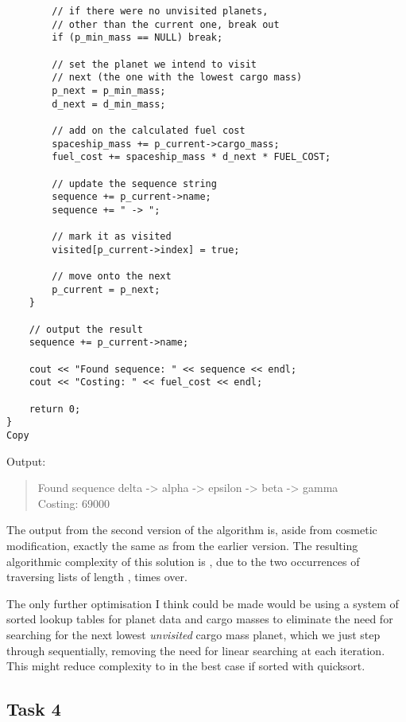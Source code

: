 \documentclass[
]{article}
\begin{document}
\begin{verbatim}
        // if there were no unvisited planets,
        // other than the current one, break out
        if (p_min_mass == NULL) break;

        // set the planet we intend to visit
        // next (the one with the lowest cargo mass)
        p_next = p_min_mass;
        d_next = d_min_mass;

        // add on the calculated fuel cost
        spaceship_mass += p_current->cargo_mass;
        fuel_cost += spaceship_mass * d_next * FUEL_COST;

        // update the sequence string
        sequence += p_current->name;
        sequence += " -> ";

        // mark it as visited
        visited[p_current->index] = true;

        // move onto the next
        p_current = p_next;
    }

    // output the result
    sequence += p_current->name;

    cout << "Found sequence: " << sequence << endl;
    cout << "Costing: " << fuel_cost << endl;

    return 0;
}
Copy
\end{verbatim}

Output:

\begin{quote}
Found sequence delta -\textgreater{} alpha -\textgreater{} epsilon
-\textgreater{} beta -\textgreater{} gamma\\
Costing: 69000
\end{quote}

The output from the second version of the algorithm is, aside from
cosmetic modification, exactly the same as from the earlier version. The
resulting algorithmic complexity of this solution is {}, due to the two
occurrences of traversing lists of length {}, {} times over.

The only further optimisation I think could be made would be using a
system of sorted lookup tables for planet data and cargo masses to
eliminate the need for searching for the next lowest \emph{unvisited}
cargo mass planet, which we just step through sequentially, removing the
need for linear searching at each iteration. This might reduce
complexity to {} in the best case if sorted with quicksort.

\subsection{Task 4}\label{task-4}
\end{document}
